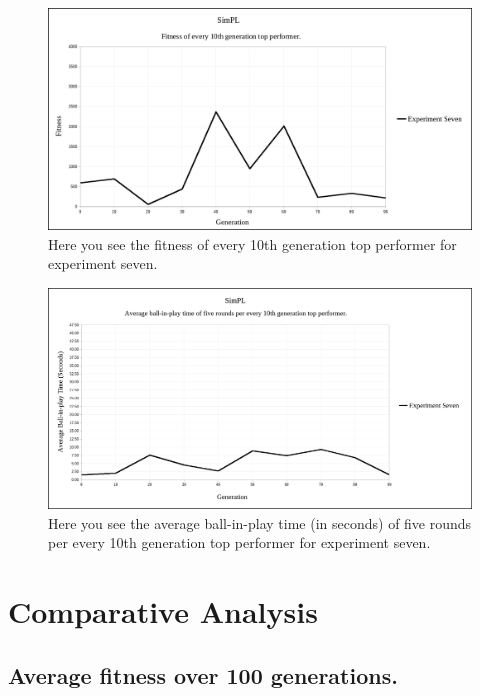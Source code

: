 \documentclass[a4paper,10pt]{article}
\begin{document}
\begin{figure}[H]  
  \centering
  \includegraphics[width=1\textwidth]{figures/exp7_10_tops.png}
  \caption{Here you see the fitness of every 10th generation top performer for experiment seven.}
  \label{fig:exp7_10_tops}
\end{figure}

\begin{figure}[H]  
  \centering
  \includegraphics[width=1\textwidth]{figures/exp7_10_tops_times.png}
  \caption{Here you see the average ball-in-play time (in seconds) of five rounds per every 10th generation top performer for experiment seven.}
  \label{fig:exp7_10_tops_times}
\end{figure}

\section{Comparative Analysis}

\subsection{Average fitness over 100 generations.}
\end{document}
